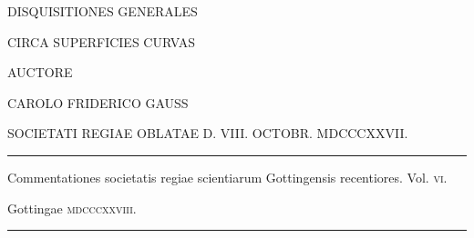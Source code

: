 \clearpage
{}
\thispagestyle{empty}
\vspace*{.5in}
\begin{center}
{\large DISQUISITIONES GENERALES}\par\bigskip
{\Large CIRCA SUPERFICIES CURVAS}\par\vspace{50pt}
AUCTORE\par\vspace{55pt}
{\large CAROLO FRIDERICO GAUSS}\par\vspace{45pt}
{\small SOCIETATI REGIAE OBLATAE D. VIII. OCTOBR. MDCCCXXVII.}
\end{center}
\vfill
\begin{center}
\rule{.8\linewidth}{.3pt}\par\smallskip
Commentationes societatis regiae scientiarum Gottingensis recentiores. Vol. \textsc{vi}.\par
Gottingae \textsc{mdcccxxviii}.\par\smallskip
\rule{.8\linewidth}{.3pt}
\end{center}
\clearpage

